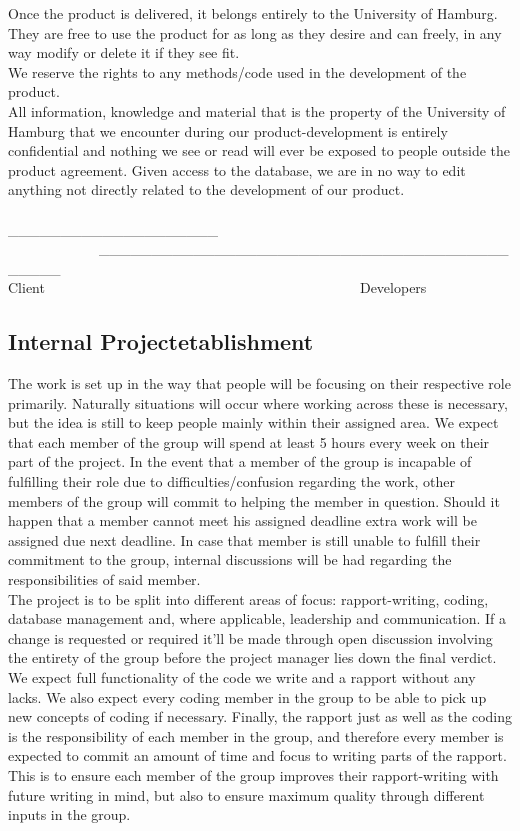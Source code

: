 \documentclass[12pt,a4paper]{article}
\begin{document}
Once the product is delivered, it belongs entirely to the University of Hamburg. They are free to use the product for as long as they desire and can freely, in any way modify or delete it if they see fit.\\
We reserve the rights to any methods/code used in the development of the product.\\
All information, knowledge and material that is the property of the University of Hamburg that we encounter during our product-development is entirely confidential and nothing we see or read will ever be exposed to people outside the product agreement.
Given access to the database, we are in no way to edit anything not directly related to the development of our product.\\\\


\_\_\_\_\_\_\_\_\_\_\_\_\_\_\_\_\_\_\_\_ ~~~~~~~~~~~~~\_\_\_\_\_\_\_\_\_\_\_\_\_\_\_\_\_\_\_\_\_\_\_\_\_\_\_\_\_\_\_\_\_\_\_\_\_\_\_\_\_\_\_\_\\
Client~~~~~~~~~~~~~~~~~~~~~~~~~~~~~~~~~~~~~~~~~~~~~Developers       

\newpage
\subsection{Internal Projectetablishment}
The work is set up in the way that people will be focusing on their respective role primarily. Naturally situations will occur where working across these is necessary, but the idea is still to keep people mainly within their assigned area. We expect that each member of the group will spend at least 5 hours every week on their part of the project. In the event that a member of the group is incapable of fulfilling their role due to difficulties/confusion regarding the work, other members of the group will commit to helping the member in question. Should it happen that a member cannot meet his assigned deadline extra work will be assigned due next deadline. In case that member is still unable to fulfill their commitment to the group, internal discussions will be had regarding the responsibilities of said member. \\
The project is to be split into different areas of focus: rapport-writing, coding, database management and, where applicable, leadership and communication. If a change is requested or required it’ll be made through open discussion involving the entirety of the group before the project manager lies down the final verdict.\\
We expect full functionality of the code we write and a rapport without any lacks. We also expect every coding member in the group to be able to pick up new concepts of coding if necessary. Finally, the rapport just as well as the coding is the responsibility of each member in the group, and therefore every member is expected to commit an amount of time and focus to writing parts of the rapport. This is to ensure each member of the group improves their rapport-writing with future writing in mind, but also to ensure maximum quality through different inputs in the group.


                                                   
\end{document}
